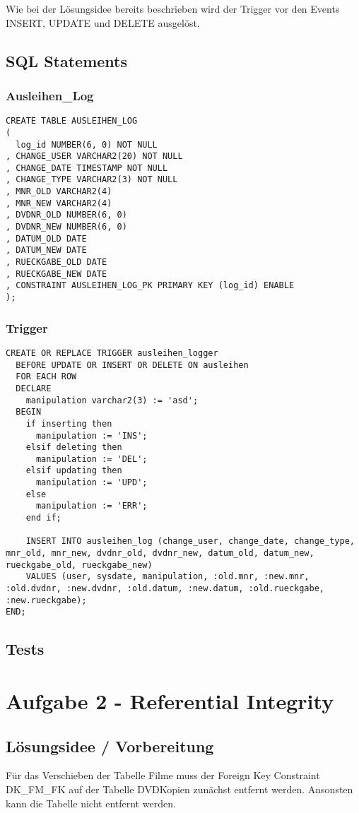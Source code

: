 \documentclass[11pt,a4paper,parskip=half]{scrartcl}
\begin{document}
Wie bei der Lösungsidee bereits beschrieben wird der Trigger vor den Events INSERT, UPDATE und DELETE ausgelöst.

\subsection{SQL Statements}
\subsubsection{Ausleihen\_Log}
\begin{lstlisting}
CREATE TABLE AUSLEIHEN_LOG
(
  log_id NUMBER(6, 0) NOT NULL 
, CHANGE_USER VARCHAR2(20) NOT NULL 
, CHANGE_DATE TIMESTAMP NOT NULL 
, CHANGE_TYPE VARCHAR2(3) NOT NULL
, MNR_OLD VARCHAR2(4)
, MNR_NEW VARCHAR2(4)
, DVDNR_OLD NUMBER(6, 0)
, DVDNR_NEW NUMBER(6, 0)
, DATUM_OLD DATE
, DATUM_NEW DATE
, RUECKGABE_OLD DATE 
, RUECKGABE_NEW DATE 
, CONSTRAINT AUSLEIHEN_LOG_PK PRIMARY KEY (log_id) ENABLE 
);
\end{lstlisting}

\subsubsection{Trigger}
\begin{lstlisting}
CREATE OR REPLACE TRIGGER ausleihen_logger
  BEFORE UPDATE OR INSERT OR DELETE ON ausleihen
  FOR EACH ROW
  DECLARE
    manipulation varchar2(3) := 'asd';
  BEGIN
    if inserting then
      manipulation := 'INS';
    elsif deleting then
      manipulation := 'DEL';
    elsif updating then
      manipulation := 'UPD';
    else 
      manipulation := 'ERR';
    end if;
    
    INSERT INTO ausleihen_log (change_user, change_date, change_type, mnr_old, mnr_new, dvdnr_old, dvdnr_new, datum_old, datum_new, rueckgabe_old, rueckgabe_new) 
    VALUES (user, sysdate, manipulation, :old.mnr, :new.mnr, :old.dvdnr, :new.dvdnr, :old.datum, :new.datum, :old.rueckgabe, :new.rueckgabe);
END;
\end{lstlisting}

\subsection{Tests}


\section{Aufgabe 2 - Referential Integrity}
\subsection{Lösungsidee / Vorbereitung}
Für das Verschieben der Tabelle \glqq{}Filme\grqq{} muss der Foreign Key Constraint \glqq{}DK\_FM\_FK\grqq{} auf der Tabelle \glqq{}DVDKopien\grqq{} zunächst entfernt werden. Ansonsten kann die Tabelle nicht entfernt werden.
\end{document}
